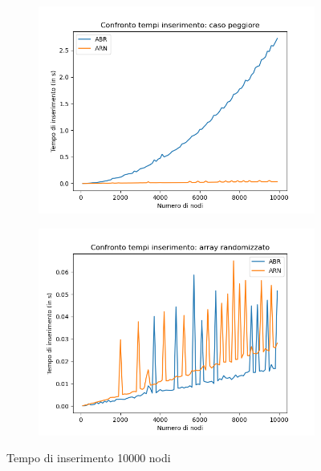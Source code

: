 \documentclass[
]{article}
\begin{document}
\begin{figure}[h!]
	\centering
	\begin{subfigure}[b]{0.4\linewidth}
		\includegraphics[width=\linewidth]{../../img/w_case/ins_10000.png}
	\end{subfigure}
	\begin{subfigure}[b]{0.4\linewidth}
		\includegraphics[width=\linewidth]{../../img/rand/ins_10000.png}
	\end{subfigure}
	\caption{Tempo di inserimento 10000 nodi}
	\label{fig:1}
\end{figure}
\end{document}
